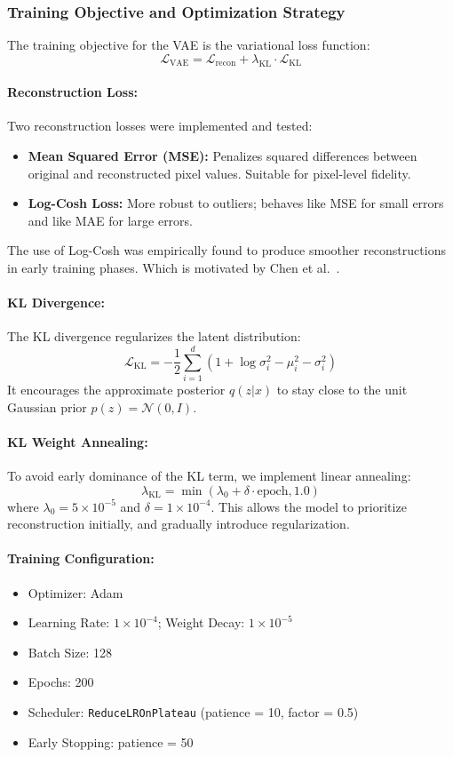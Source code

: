\subsubsection{Training Objective and Optimization Strategy} \label{subsubsec:vae_loss}

The training objective for the VAE is the variational loss function:
\[
\mathcal{L}_{\text{VAE}} = \mathcal{L}_{\text{recon}} + \lambda_{\text{KL}} \cdot \mathcal{L}_{\text{KL}}
\]

\paragraph{Reconstruction Loss:} \label{reconstruction_loss}
Two reconstruction losses were implemented and tested:
\begin{itemize}
    \item \textbf{Mean Squared Error (MSE):} Penalizes squared differences between original and reconstructed pixel values. Suitable for pixel-level fidelity.
    \item \textbf{Log-Cosh Loss:} More robust to outliers; behaves like MSE for small errors and like MAE for large errors.
\end{itemize}
The use of Log-Cosh was empirically found to produce smoother reconstructions in early training phases. Which is motivated by Chen et al.~\cite{chen2019log}.

\paragraph{KL Divergence:}
The KL divergence regularizes the latent distribution:
\[
\mathcal{L}_{\text{KL}} = -\frac{1}{2} \sum_{i=1}^{d} \left(1 + \log\sigma_i^2 - \mu_i^2 - \sigma_i^2\right)
\]
It encourages the approximate posterior $q(z|x)$ to stay close to the unit Gaussian prior $p(z) = \mathcal{N}(0, I)$.

\paragraph{KL Weight Annealing:}
To avoid early dominance of the KL term, we implement linear annealing:
\[
\lambda_{\text{KL}} = \min(\lambda_0 + \delta \cdot \text{epoch}, 1.0)
\]
where $\lambda_0 = 5 \times 10^{-5}$ and $\delta = 1 \times 10^{-4}$. This allows the model to prioritize reconstruction initially, and gradually introduce regularization.

\paragraph{Training Configuration:}
\begin{itemize}
    \item Optimizer: Adam
    \item Learning Rate: $1 \times 10^{-4}$; Weight Decay: $1 \times 10^{-5}$
    \item Batch Size: 128
    \item Epochs: 200
    \item Scheduler: \texttt{ReduceLROnPlateau} (patience = 10, factor = 0.5)
    \item Early Stopping: patience = 50
\end{itemize}

